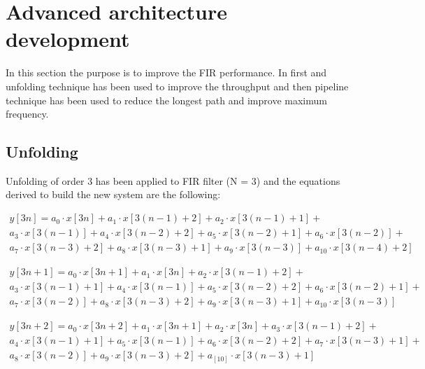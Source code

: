 %
\chapter{Advanced architecture development}
\label{cha3}

In this section the purpose is to improve the FIR performance. In first and unfolding 
technique has been used to improve the throughput and then pipeline technique has 
been used to reduce the longest path and improve maximum frequency.

\section{Unfolding}

Unfolding of order 3 has been applied to FIR filter (N = 3) and the equations derived
to build the new system are the following:

\begin{equation}
\begin{split}
    y[3n] = a_0 \cdot x[3n] + a_1 \cdot x[3(n-1) + 2] + a_2 \cdot x[3(n-1) + 1] + \\
    a_3 \cdot x[3(n-1)] + a_4 \cdot x[3(n-2) + 2] + a_5 \cdot x[3(n-2) + 1] + a_6 \cdot x[3(n-2)] +  \\
    a_7 \cdot x[3(n-3) + 2] + a_8 \cdot x[3(n-3) + 1] + a_9 \cdot x[3(n-3)] + a_{10} \cdot x[3(n-4) + 2]
\end{split}
\end{equation}

\begin{equation}
\begin{split}
    y[3n + 1] = a_0 \cdot x[3n + 1] + a_1 \cdot x[3n] + a_2 \cdot x[3(n-1) + 2] + \\
    a_3 \cdot x[3(n-1) + 1] + a_4 \cdot x[3(n-1)] + a_5 \cdot x[3(n-2) + 2] + a_6 \cdot x[3(n-2)+1] +  \\
    a_7 \cdot x[3(n-2)] + a_8 \cdot x[3(n-3)+2] + a_9 \cdot x[3(n-3) + 1] + a_{10} \cdot x[3(n-3)]
\end{split}
\end{equation}

\begin{equation}
\begin{split}
    y[3n + 2] = a_0 \cdot x[3n + 2] + a_1 \cdot x[3n + 1] + a_2 \cdot x[3n] + a_3 \cdot x[3(n-1) + 2] +\\
    a_4 \cdot x[3(n-1) + 1] + a_5 \cdot x[3(n-1)] + a_6 \cdot x[3(n-2) + 2] +  a_7 \cdot x[3(n-3) + 1] +\\
    a_8 \cdot x[3(n-2)] + a_9 \cdot x[3(n-3) + 2] + a_[10] \cdot x[3(n-3) + 1]
\end{split}
\end{equation}

